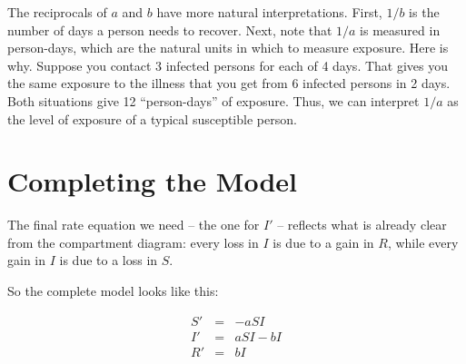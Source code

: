 \documentclass
[justified,nohyper]
{tufte-handout}
\begin{document}
The reciprocals of $a$ and $b$ have more natural interpretations. First, $1/b$ is 
the number of days a person needs to recover. Next, note that $1/a$ is measured 
in person-days, which are the natural units in which to measure exposure. Here is 
why. Suppose you contact 3 infected persons for each of 4 days. That gives you 
the same exposure to the illness that you get from 6 infected persons in 2 days. 
Both situations give 12 ``person-days'' of exposure. Thus, we can interpret $1/a$ 
as the level of exposure of a typical susceptible person.

\section{Completing the Model}
The final rate equation we need -- the one for $I'$ -- reflects what is already 
clear from the compartment diagram: every loss in $I$ is due to a gain in $R$, 
while every gain in $I$ is due to a loss in $S$.

So the complete model looks like this:

\begin{eqnarray*}
    S' &=& -aSI \\
    I' &=& aSI - bI \\
    R' &=& bI \\
\end{eqnarray*}

\end{document}

